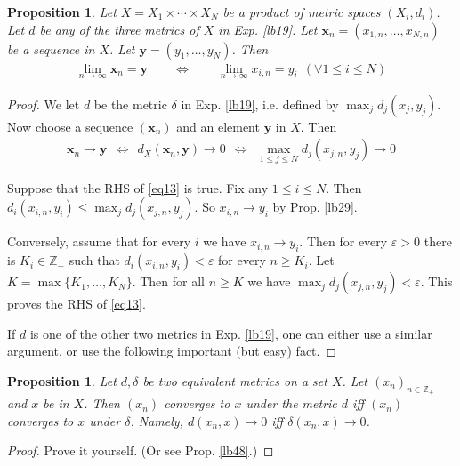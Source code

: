 \documentclass[12pt,b5paper,notitlepage]{article}
\theoremstyle{definition}
\theoremstyle{plain}
\newtheorem{pp}[df]{Proposition}
\newcommand{\mbf}{\mathbf}
\newcommand{\Zbb}{\mathbb Z}
\newcommand{\eps}{\varepsilon}
\numberwithin{equation}{section}
\begin{document}
\begin{pp}\label{lb38}
Let $X=X_1\times\cdots\times X_N$ be a product of metric spaces $(X_i,d_i)$. Let $d$ be any of the three metrics of $X$ in Exp. \ref{lb19}. Let $\mbf x_n=(x_{1,n},\dots,x_{N,n})$ be a sequence in $X$. Let $\mbf y=(y_1,\dots,y_N)$. Then 
\begin{align*}
\lim_{n\rightarrow\infty} \mbf x_n=\mbf y\qquad\Longleftrightarrow \qquad \lim_{n\rightarrow\infty} x_{i,n}=y_i~~(\forall 1\leq i\leq N)
\end{align*}
\end{pp}

\begin{proof}
We let $d$ be the metric $\delta$ in Exp. \ref{lb19}, i.e. defined by $\max_j d_j(x_j,y_j)$. Now choose a sequence $(\mbf x_n)$ and an element $\mbf y$ in $X$. Then
\begin{align}
\mbf x_n\rightarrow \mbf y~~\Longleftrightarrow~~ d_X(\mbf x_n,\mbf y)\rightarrow 0 ~~\Longleftrightarrow~~ \max_{1\leq j\leq N} d_j(x_{j,n},y_j)\rightarrow 0  \label{eq13}
\end{align}


Suppose that the RHS of \eqref{eq13} is true. Fix any $1\leq i\leq N$. Then $d_i(x_{i,n},y_i)\leq \max_j d_j(x_{j,n},y_j)$. So $x_{i,n}\rightarrow y_i$ by Prop. \ref{lb29}.

Conversely, assume that for every $i$ we have $x_{i,n}\rightarrow y_i$. Then for every $\eps>0$ there is $K_i\in\Zbb_+$ such that $d_i(x_{i,n},y_i)<\varepsilon$ for every $n\geq K_i$. Let $K=\max\{K_1,\dots,K_N\}$. Then for all $n\geq K$ we have $\max_j d_j(x_{j,n},y_j)<\eps$. This proves the RHS of \eqref{eq13}.

If $d$ is one of the other two metrics in Exp. \ref{lb19}, one can either use a similar argument, or use the following important (but easy) fact.
\end{proof}





\begin{pp}
Let $d,\delta$ be two equivalent metrics on a set $X$. Let $(x_n)_{n\in\Zbb_+}$ and $x$ be in $X$. Then $(x_n)$ converges to $x$ under the metric $d$ iff  $(x_n)$ converges to $x$ under $\delta$. Namely, $d(x_n,x)\rightarrow 0$ iff $\delta(x_n,x)\rightarrow 0$.
\end{pp}

\begin{proof}
Prove it yourself. (Or see Prop. \ref{lb48}.)
\end{proof}
\end{document}
